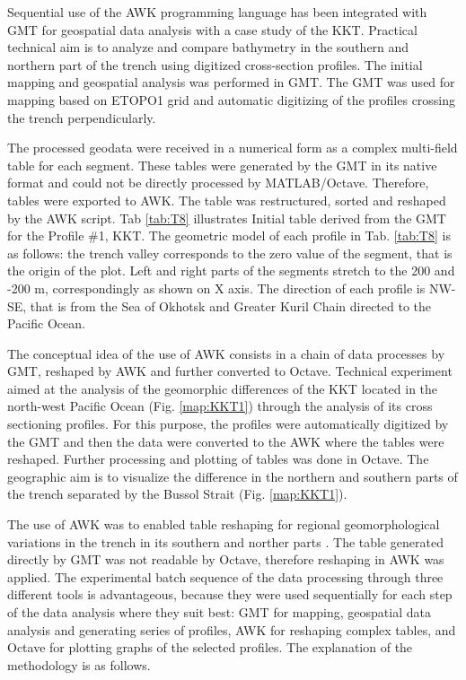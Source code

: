 \documentclass[11pt,a4paper]{report}
\begin{document}
{Sequential use of the AWK programming language has been integrated with \ac{GMT} for geospatial data analysis with a case study of the \ac{KKT}. Practical technical aim is to analyze and compare bathymetry in the southern and northern part of the trench using digitized cross-section profiles. The initial mapping and geospatial analysis was performed in \ac{GMT}. The \ac{GMT} was used for mapping based on \ac{ETOPO1} grid and automatic digitizing of the profiles crossing the trench perpendicularly. 

The processed geodata were received in a numerical form as a complex multi-field table for each segment. These tables were generated by the \ac{GMT} in its native format and could not be directly processed by MATLAB/Octave. Therefore, tables were exported to AWK. The table was restructured, sorted and reshaped by the AWK script. Tab \ref{tab:T8} illustrates Initial table derived from the \ac{GMT} for the Profile \#1, \ac{KKT}. The geometric model of each profile in Tab. \ref{tab:T8} is as follows: the trench valley corresponds to the zero value of the segment, that is the origin of the plot. Left and right parts of the segments stretch to the 200 and -200 m, correspondingly as shown on X axis. The direction of each profile is NW-SE, that is from the Sea of Okhotsk and Greater Kuril Chain directed to the Pacific Ocean.

The conceptual idea of the use of AWK consists in a chain of data processes by \ac{GMT}, reshaped by AWK and further converted to Octave. Technical experiment aimed at the analysis of the geomorphic differences of the \ac{KKT} located in the north-west Pacific Ocean (Fig. \ref{map:KKT1}) through the analysis of its cross sectioning profiles. For this purpose, the profiles were automatically digitized by the GMT and then the data were converted to the AWK where the tables were reshaped. Further processing and plotting of tables was done in Octave. The geographic aim is to visualize the difference in the northern and southern parts of the trench separated by the Bussol Strait (Fig. \ref{map:KKT1}). 

The use of AWK was to enabled table reshaping for regional geomorphological variations in the trench in its southern and norther parts \cite{Lemenkova2019100}. The table generated directly by \ac{GMT} was not readable by Octave, therefore reshaping in AWK was applied. The experimental batch sequence of the data processing through three different tools is advantageous, because they were used sequentially for each step of the data analysis where they suit best: \ac{GMT} for mapping, geospatial data analysis and generating series of profiles, AWK for reshaping complex tables, and Octave for plotting graphs of the selected profiles. The explanation of the methodology is as follows.

}
\end{document}

